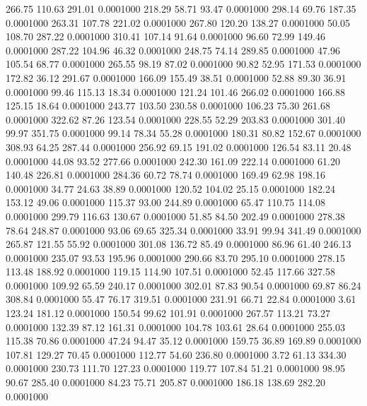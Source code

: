  266.75  110.63  291.01   0.0001000
 218.29   58.71   93.47   0.0001000
 298.14   69.76  187.35   0.0001000
 263.31  107.78  221.02   0.0001000
 267.80  120.20  138.27   0.0001000
  50.05  108.70  287.22   0.0001000
 310.41  107.14   91.64   0.0001000
  96.60   72.99  149.46   0.0001000
 287.22  104.96   46.32   0.0001000
 248.75   74.14  289.85   0.0001000
  47.96  105.54   68.77   0.0001000
 265.55   98.19   87.02   0.0001000
  90.82   52.95  171.53   0.0001000
 172.82   36.12  291.67   0.0001000
 166.09  155.49   38.51   0.0001000
  52.88   89.30   36.91   0.0001000
  99.46  115.13   18.34   0.0001000
 121.24  101.46  266.02   0.0001000
 166.88  125.15   18.64   0.0001000
 243.77  103.50  230.58   0.0001000
 106.23   75.30  261.68   0.0001000
 322.62   87.26  123.54   0.0001000
 228.55   52.29  203.83   0.0001000
 301.40   99.97  351.75   0.0001000
  99.14   78.34   55.28   0.0001000
 180.31   80.82  152.67   0.0001000
 308.93   64.25  287.44   0.0001000
 256.92   69.15  191.02   0.0001000
 126.54   83.11   20.48   0.0001000
  44.08   93.52  277.66   0.0001000
 242.30  161.09  222.14   0.0001000
  61.20  140.48  226.81   0.0001000
 284.36   60.72   78.74   0.0001000
 169.49   62.98  198.16   0.0001000
  34.77   24.63   38.89   0.0001000
 120.52  104.02   25.15   0.0001000
 182.24  153.12   49.06   0.0001000
 115.37   93.00  244.89   0.0001000
  65.47  110.75  114.08   0.0001000
 299.79  116.63  130.67   0.0001000
  51.85   84.50  202.49   0.0001000
 278.38   78.64  248.87   0.0001000
  93.06   69.65  325.34   0.0001000
  33.91   99.94  341.49   0.0001000
 265.87  121.55   55.92   0.0001000
 301.08  136.72   85.49   0.0001000
  86.96   61.40  246.13   0.0001000
 235.07   93.53  195.96   0.0001000
 290.66   83.70  295.10   0.0001000
 278.15  113.48  188.92   0.0001000
 119.15  114.90  107.51   0.0001000
  52.45  117.66  327.58   0.0001000
 109.92   65.59  240.17   0.0001000
 302.01   87.83   90.54   0.0001000
  69.87   86.24  308.84   0.0001000
  55.47   76.17  319.51   0.0001000
 231.91   66.71   22.84   0.0001000
   3.61  123.24  181.12   0.0001000
 150.54   99.62  101.91   0.0001000
 267.57  113.21   73.27   0.0001000
 132.39   87.12  161.31   0.0001000
 104.78  103.61   28.64   0.0001000
 255.03  115.38   70.86   0.0001000
  47.24   94.47   35.12   0.0001000
 159.75   36.89  169.89   0.0001000
 107.81  129.27   70.45   0.0001000
 112.77   54.60  236.80   0.0001000
   3.72   61.13  334.30   0.0001000
 230.73  111.70  127.23   0.0001000
 119.77  107.84   51.21   0.0001000
  98.95   90.67  285.40   0.0001000
  84.23   75.71  205.87   0.0001000
 186.18  138.69  282.20   0.0001000
